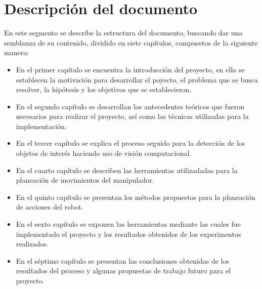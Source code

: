 \section{Descripción del documento}

En este segmento se describe la estructura del documento, buscando dar una semblanza de su contenido, dividido en siete capítulos, compuestos de la siguiente manera:
\begin{itemize}
    \item En el primer capítulo se encuentra la introducción del proyecto, en ella se establecen la motivación para desarrollar el poyecto, el problema que se busca resolver, la hipótesis y los objetivos que se establecieron.
    \item En el segundo capítulo se desarrollan los antecedentes teóricos que fueron necesarios para realizar el proyecto, así como las técnicas utilizadas para la implementación.
    \item En el tercer capítulo se explica el proceso seguido para la detección de los objetos de interés haciendo uso de visión computacional.
    \item En el cuarto capítulo se describen las herramientas utilizadadas para la planeación de movimientos del manipulador.
    \item En el quinto capítulo se presentan los métodos propuestos para la planeación de acciones del robot.
    \item En el sexto capítulo se exponen las herramientas mediante las cuales fue implementado el proyecto y los resultados obtenidos de los experimentos realizados.
    \item En el séptimo capítulo se presentan las conclusiones obtenidas de los resultados del proceso y algunas propuestas de trabajo futuro para el proyecto.
\end{itemize}
